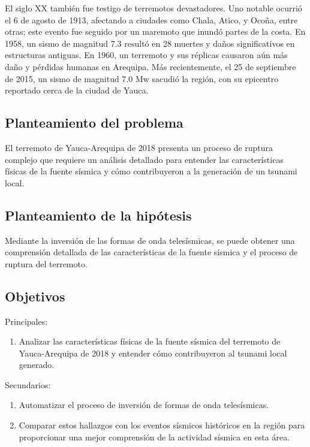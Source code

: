 \documentclass[spanish,a4paper,11pt]{article}
\begin{document}
El siglo XX también fue testigo de terremotos devastadores. Uno notable ocurrió el 6 de agosto de 1913, afectando a ciudades como Chala, Atico, y Ocoña, entre otras; este evento fue seguido por un maremoto que inundó partes de la costa. En 1958, un sismo de magnitud 7.3 resultó en 28 muertes y daños significativos en estructuras antiguas. En 1960, un terremoto y sus réplicas causaron aún más daño y pérdidas humanas en Arequipa. Más recientemente, el 25 de septiembre de 2015, un sismo de magnitud 7.0 Mw sacudió la región, con su epicentro reportado cerca de la ciudad de Yauca.

\subsection*{Planteamiento del problema}
El terremoto de Yauca-Arequipa de 2018 presenta un proceso de ruptura complejo que requiere un análisis detallado para entender las características físicas de la fuente sísmica y cómo contribuyeron a la generación de un tsunami local. \cite{CEN13}

\subsection*{Planteamiento de la hipótesis}
Mediante la inversión de las formas de onda telesísmicas, se puede obtener una comprensión detallada de las características de la fuente sísmica y el proceso de ruptura del terremoto.

\subsection*{Objetivos} 

Principales:

\begin{enumerate}
  \item Analizar las características físicas de la fuente sísmica del terremoto de Yauca-Arequipa de 2018 y entender cómo contribuyeron al tsunami local generado.
\end{enumerate}

Secundarios:

\begin{enumerate}
  \item Automatizar el proceso de inversión de formas de onda telesísmicas.
  \item Comparar estos hallazgos con los eventos sísmicos históricos en la región para proporcionar una mejor comprensión de la actividad sísmica en esta área.
\end{enumerate}
\end{document}
